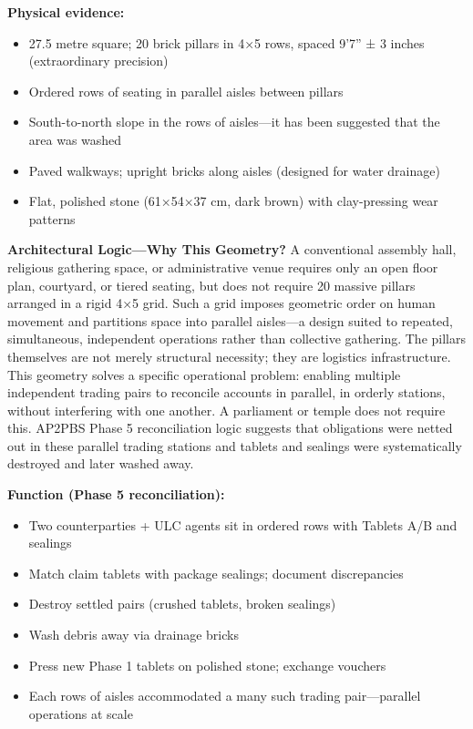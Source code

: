 \documentclass[12pt]{article}
\begin{document}
\textbf{Physical evidence:}
\begin{itemize}
\item 27.5 metre square; 20 brick pillars in 4×5 rows, spaced 9'7'' ± 3 inches (extraordinary precision)
\item Ordered rows of seating in parallel aisles between pillars
\item South-to-north slope in the rows of aisles---it has been suggested that the area was washed
\item Paved walkways; upright bricks along aisles (designed for water drainage)
\item Flat, polished stone (61×54×37 cm, dark brown) with clay-pressing wear patterns
\end{itemize}

\textbf{Architectural Logic---Why This Geometry?} A conventional assembly hall, 
religious gathering space, or administrative venue requires only an open floor plan, 
courtyard, or tiered seating, but does not require 20 massive pillars arranged in a 
rigid 4×5 grid. Such a grid imposes geometric order on human movement and partitions 
space into parallel aisles---a design suited to repeated, simultaneous, independent 
operations rather than collective gathering. The pillars themselves are not merely 
structural necessity; they are logistics infrastructure. This geometry solves a specific 
operational problem: enabling multiple independent trading pairs to reconcile accounts 
in parallel, in orderly stations, without interfering with one another. A parliament 
or temple does not require this. AP2PBS Phase 5 reconciliation logic suggests that
obligations were netted out in these parallel trading stations and tablets and
sealings were systematically destroyed and later washed away.

\textbf{Function (Phase 5 reconciliation):}
\begin{itemize}
\item Two counterparties + ULC agents sit in ordered rows with Tablets A/B and sealings
\item Match claim tablets with package sealings; document discrepancies
\item Destroy settled pairs (crushed tablets, broken sealings)
\item Wash debris away via drainage bricks
\item Press new Phase 1 tablets on polished stone; exchange vouchers
\item Each rows of aisles accommodated a many such trading pair---parallel operations at scale
\end{itemize}
\end{document}
